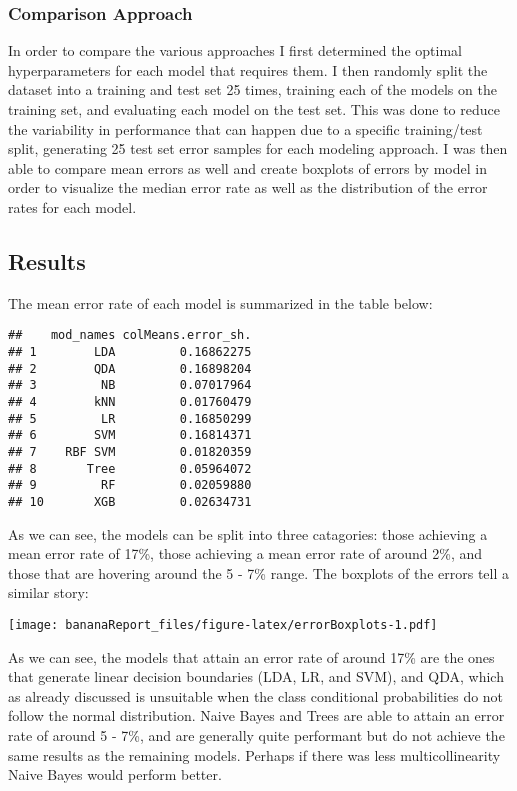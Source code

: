 \documentclass[
]{article}
\begin{document}
\hypertarget{comparison-approach}{%
\subsubsection{Comparison Approach}\label{comparison-approach}}

In order to compare the various approaches I first determined the
optimal hyperparameters for each model that requires them. I then
randomly split the dataset into a training and test set 25 times,
training each of the models on the training set, and evaluating each
model on the test set. This was done to reduce the variability in
performance that can happen due to a specific training/test split,
generating 25 test set error samples for each modeling approach. I was
then able to compare mean errors as well and create boxplots of errors
by model in order to visualize the median error rate as well as the
distribution of the error rates for each model.

\hypertarget{results}{%
\subsection{Results}\label{results}}

The mean error rate of each model is summarized in the table below:

\begin{verbatim}
##    mod_names colMeans.error_sh.
## 1        LDA         0.16862275
## 2        QDA         0.16898204
## 3         NB         0.07017964
## 4        kNN         0.01760479
## 5         LR         0.16850299
## 6        SVM         0.16814371
## 7    RBF SVM         0.01820359
## 8       Tree         0.05964072
## 9         RF         0.02059880
## 10       XGB         0.02634731
\end{verbatim}

As we can see, the models can be split into three catagories: those
achieving a mean error rate of 17\%, those achieving a mean error rate
of around 2\%, and those that are hovering around the 5 - 7\% range. The
boxplots of the errors tell a similar story:

\texttt{[image: bananaReport\_files/figure-latex/errorBoxplots-1.pdf]}

As we can see, the models that attain an error rate of around 17\% are
the ones that generate linear decision boundaries (LDA, LR, and SVM),
and QDA, which as already discussed is unsuitable when the class
conditional probabilities do not follow the normal distribution. Naive
Bayes and Trees are able to attain an error rate of around 5 - 7\%, and
are generally quite performant but do not achieve the same results as
the remaining models. Perhaps if there was less multicollinearity Naive
Bayes would perform better.
\end{document}
